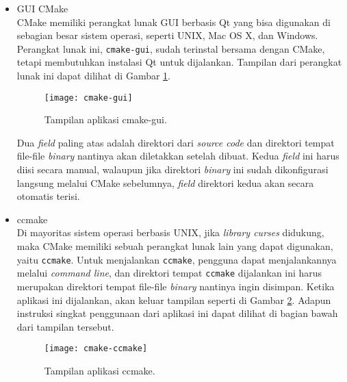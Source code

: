 \begin{enumerate}
	\begin{itemize}
		\item GUI CMake\\
		CMake memiliki perangkat lunak GUI berbasis Qt yang bisa digunakan di sebagian besar sistem operasi, seperti UNIX, Mac OS X, dan Windows. Perangkat lunak ini, \verb|cmake-gui|, sudah terinstal bersama dengan CMake, tetapi membutuhkan instalasi Qt untuk dijalankan. Tampilan dari perangkat lunak ini dapat dilihat di Gambar \ref{fig:cmake-gui}.
		
		\begin{figure}[ht]
		    \centering
		    \texttt{[image: cmake-gui]}
		    \caption[Tampilan aplikasi cmake-gui]{Tampilan aplikasi cmake-gui\protect\footnotemark.}
		    \label{fig:cmake-gui}
		\end{figure}
		
		Dua \textit{field} paling atas adalah direktori dari \textit{source code} dan direktori tempat file-file \textit{binary} nantinya akan diletakkan setelah dibuat. Kedua \textit{field} ini harus diisi secara manual, walaupun jika direktori \textit{binary} ini sudah dikonfigurasi langsung melalui CMake sebelumnya, \textit{field} direktori kedua akan secara otomatis terisi.
		
		\item ccmake\\
		Di mayoritas sistem operasi berbasis UNIX, jika \textit{library curses}	didukung, maka CMake memiliki sebuah perangkat lunak lain yang dapat digunakan, yaitu \verb|ccmake|. Untuk menjalankan \verb|ccmake|, pengguna dapat menjalankannya melalui \textit{command line}, dan direktori tempat \verb|ccmake| dijalankan ini harus merupakan direktori tempat file-file \textit{binary} nantinya ingin disimpan. Ketika aplikasi ini dijalankan, akan keluar tampilan seperti di Gambar \ref{fig:cmake-ccmake}. Adapun instruksi singkat penggunaan dari aplikasi ini dapat dilihat di bagian bawah dari tampilan tersebut.
		\newpage 
		\begin{figure}[ht]
		    \centering
		    \texttt{[image: cmake-ccmake]}
		    \caption[Tampilan aplikasi ccmake]{Tampilan aplikasi ccmake\protect\footnotemark.}
		    \label{fig:cmake-ccmake}
		\end{figure}
		

\end{itemize}
\end{enumerate}
